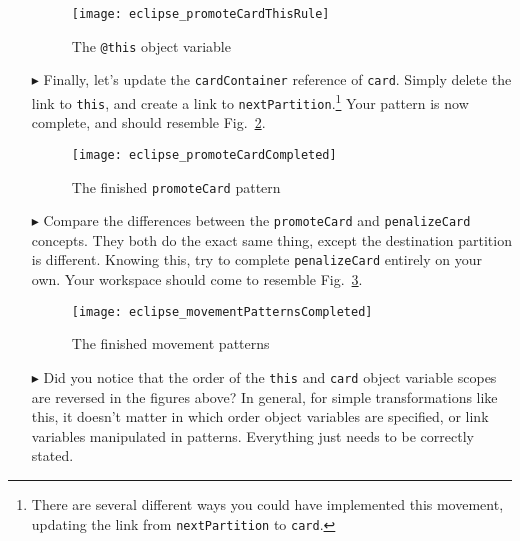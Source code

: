 \begin{itemize}
\vspace{0.5cm}

\begin{figure}[htbp]
\begin{center}
  \texttt{[image: eclipse\_promoteCardThisRule]}
  \caption{The \texttt{@this} object variable}
  \label{fig:promoteThisRule}
\end{center}
\end{figure} 

\item[$\blacktriangleright$] Finally, let's update the \texttt{cardContainer} reference of \texttt{card}. Simply delete the link to \texttt{this}, and create
a link to \texttt{nextPartition}.\footnote{There are several different ways you could have implemented this movement, updating the link from
\texttt{nextPartition} to \texttt{card}.} Your pattern is now complete, and should resemble Fig.~\ref{fig:completedPromote}.

\begin{figure}[htbp]
\begin{center}
  \texttt{[image: eclipse\_promoteCardCompleted]}
  \caption{The finished \texttt{promoteCard} pattern}
  \label{fig:completedPromote}
\end{center}
\end{figure} 

\item[$\blacktriangleright$] Compare the differences between the \texttt{promoteCard} and \texttt{penalizeCard} concepts. They both do the exact same thing,
except the destination partition is different. Knowing this, try to complete \texttt{penalizeCard} entirely on your own. Your workspace should come to
resemble Fig.~\ref{fig:completedPatterns}.

\vspace{0.5cm}

\begin{figure}[htbp]
\begin{center}
  \texttt{[image: eclipse\_movementPatternsCompleted]}
  \caption{The finished movement patterns}
  \label{fig:completedPatterns}
\end{center}
\end{figure}


\item[$\blacktriangleright$] Did you notice that the order of the \texttt{this} and \texttt{card} object variable scopes are reversed in the figures above?
In general, for simple transformations like this, it doesn't matter in which order object variables are specified, or link variables manipulated in patterns.
Everything just needs to be correctly stated.


\end{itemize}

